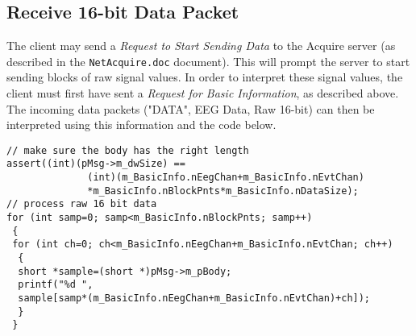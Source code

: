 \documentclass[letterpaper, oneside, 12pt]{article}
\begin{document}
\subsection{Receive 16-bit Data Packet}

The client may send a \emph{Request to Start Sending Data} to the
Acquire server
(as described in the \texttt{NetAcquire.doc} document). This will
prompt the
server to start sending blocks of raw signal values. In order to
interpret these
signal values, the client must first have sent a \emph{Request for
Basic
Information}, as described above. The incoming data packets ("DATA",
EEG Data,
Raw 16-bit) can then be interpreted using this information and the
code below.

\begin{verbatim}
// make sure the body has the right length
assert((int)(pMsg->m_dwSize) ==
              (int)(m_BasicInfo.nEegChan+m_BasicInfo.nEvtChan)
              *m_BasicInfo.nBlockPnts*m_BasicInfo.nDataSize);
// process raw 16 bit data
for (int samp=0; samp<m_BasicInfo.nBlockPnts; samp++)
 {
 for (int ch=0; ch<m_BasicInfo.nEegChan+m_BasicInfo.nEvtChan; ch++)
  {
  short *sample=(short *)pMsg->m_pBody;
  printf("%d ",
  sample[samp*(m_BasicInfo.nEegChan+m_BasicInfo.nEvtChan)+ch]);
  }
 }
\end{verbatim}


\end{document}
